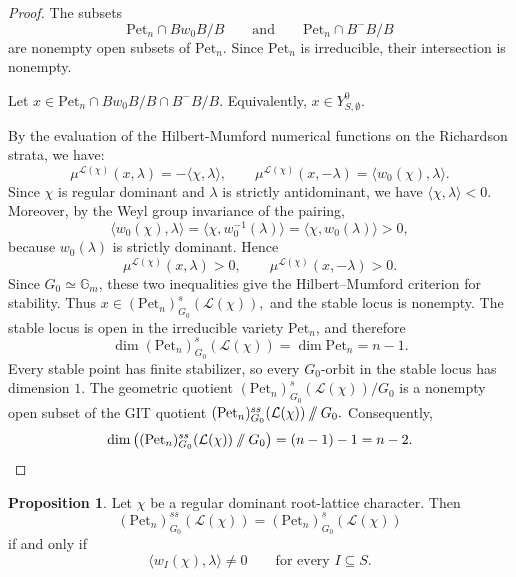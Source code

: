 \documentclass[12pt, reqno]{amsart}
\newcommand{\sslash}{\mathbin{/\mkern-6mu/}}
\theoremstyle{plain}
\numberwithin{equation}{section}
\theoremstyle{definition}
\newtheorem{proposition}[theorem]{Proposition}
\begin{document}
\begin{proof}
The subsets
\[
\mathrm{Pet}_n\cap Bw_0B/B
\qquad\text{and}\qquad
\mathrm{Pet}_n\cap B^-B/B
\]
are nonempty open subsets of \(\mathrm{Pet}_n\). Since
\(\mathrm{Pet}_n\) is irreducible, their intersection is nonempty.

Let $x\in
\mathrm{Pet}_n\cap Bw_0B/B\cap B^-B/B.$ Equivalently, $x\in Y^0_{S,\emptyset}.$

By the evaluation of the Hilbert-Mumford numerical functions on the Richardson strata, we have:
\[
\mu^{\mathcal L(\chi)}(x,\lambda)
=
-\langle\chi,\lambda\rangle,
\qquad
\mu^{\mathcal L(\chi)}(x,-\lambda)
=
\langle w_0(\chi),\lambda\rangle.
\]
Since \(\chi\) is regular dominant and \(\lambda\) is strictly
antidominant, we have $\langle\chi,\lambda\rangle<0.$
Moreover, by the Weyl group invariance of the pairing,
\[
\langle w_0(\chi),\lambda\rangle
=
\langle\chi,w_0^{-1}(\lambda)\rangle
=
\langle\chi,w_0(\lambda)\rangle>0,
\]
because \(w_0(\lambda)\) is strictly dominant. Hence
\[
\mu^{\mathcal L(\chi)}(x,\lambda)>0,
\qquad
\mu^{\mathcal L(\chi)}(x,-\lambda)>0.
\]
Since \(G_0\simeq\mathbb G_m\), these two inequalities give the
Hilbert--Mumford criterion for stability. Thus $x\in(\mathrm{Pet}_n)^s_{G_0}(\mathcal L(\chi)),$
and the stable locus is nonempty. The stable locus is open in the irreducible variety
\(\mathrm{Pet}_n\), and therefore
\[
\dim(\mathrm{Pet}_n)^s_{G_0}(\mathcal L(\chi))
=
\dim\mathrm{Pet}_n
=
n-1.
\]
Every stable point has finite stabilizer, so every \(G_0\)-orbit in
the stable locus has dimension \(1\). The geometric quotient $(\mathrm{Pet}_n)^s_{G_0}(\mathcal L(\chi))/G_0$ is a nonempty open subset of the GIT quotient $(\mathrm{Pet}_n)^{ss}_{G_0}(\mathcal L(\chi))\sslash G_0.$
Consequently,
\[
\dim\left(
(\mathrm{Pet}_n)^{ss}_{G_0}(\mathcal L(\chi))
\sslash G_0
\right)
=
(n-1)-1
=
n-2.
\]
\end{proof}

\begin{proposition}\label{lem:ss-equals-s}
Let \(\chi\) be a regular dominant root-lattice character. Then
\[
(\mathrm{Pet}_n)^{ss}_{G_0}(\mathcal L(\chi))
=
(\mathrm{Pet}_n)^s_{G_0}(\mathcal L(\chi))
\]
if and only if
\[
\langle w_I(\chi),\lambda\rangle\neq0
\qquad
\text{for every }I\subseteq S.
\]
\end{proposition}
\end{document}
